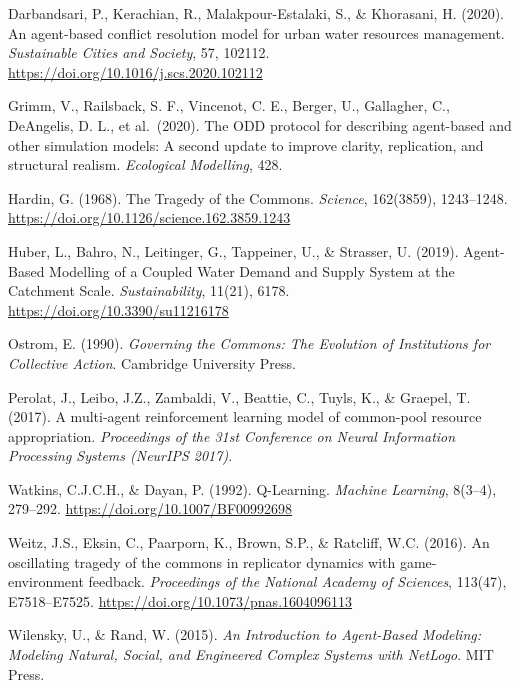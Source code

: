 \documentclass[12pt, a4paper]{article}
\begin{document}
\begin{enumerate}[label={[\arabic*]}]
    \item Darbandsari, P., Kerachian, R., Malakpour-Estalaki, S., \& Khorasani, H. (2020). An agent-based conflict resolution model for urban water resources management. \emph{Sustainable Cities and Society}, 57, 102112. \url{https://doi.org/10.1016/j.scs.2020.102112}

    \item Grimm, V., Railsback, S. F., Vincenot, C. E., Berger, U., Gallagher, C., DeAngelis, D. L., et al.\ (2020). The ODD protocol for describing agent-based and other simulation models: A second update to improve clarity, replication, and structural realism. \emph{Ecological Modelling}, 428.

    \item Hardin, G. (1968). The Tragedy of the Commons. \emph{Science}, 162(3859), 1243--1248. \url{https://doi.org/10.1126/science.162.3859.1243}

    \item Huber, L., Bahro, N., Leitinger, G., Tappeiner, U., \& Strasser, U. (2019). Agent-Based Modelling of a Coupled Water Demand and Supply System at the Catchment Scale. \emph{Sustainability}, 11(21), 6178. \url{https://doi.org/10.3390/su11216178}

    \item Ostrom, E. (1990). \emph{Governing the Commons: The Evolution of Institutions for Collective Action}. Cambridge University Press.

    \item Perolat, J., Leibo, J.Z., Zambaldi, V., Beattie, C., Tuyls, K., \& Graepel, T. (2017). A multi-agent reinforcement learning model of common-pool resource appropriation. \emph{Proceedings of the 31st Conference on Neural Information Processing Systems (NeurIPS 2017)}.

    \item Watkins, C.J.C.H., \& Dayan, P. (1992). Q-Learning. \emph{Machine Learning}, 8(3--4), 279--292. \url{https://doi.org/10.1007/BF00992698}

    \item Weitz, J.S., Eksin, C., Paarporn, K., Brown, S.P., \& Ratcliff, W.C. (2016). An oscillating tragedy of the commons in replicator dynamics with game-environment feedback. \emph{Proceedings of the National Academy of Sciences}, 113(47), E7518--E7525. \url{https://doi.org/10.1073/pnas.1604096113}

    \item Wilensky, U., \& Rand, W. (2015). \emph{An Introduction to Agent-Based Modeling: Modeling Natural, Social, and Engineered Complex Systems with NetLogo}. MIT Press.
\end{enumerate}
\end{document}
